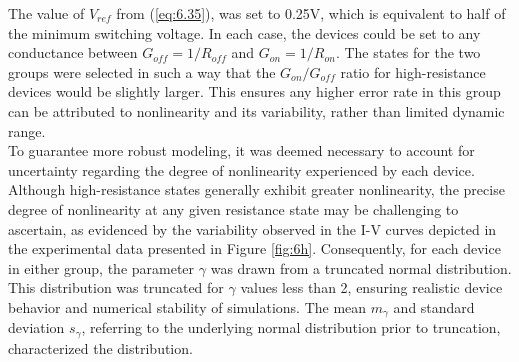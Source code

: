 \noindent The value of $V_{ref}$ from (\ref{eq:6.35}), was set to 0.25V, which is equivalent to half of the minimum switching voltage. In each case, the devices could be set to any conductance between $G_{off} = 1/R_{off}$ and $G_{on} = 1/R_{on}$. The states for the two groups were selected in such a way that the $G_{on}/G_{off}$ ratio for high-resistance devices would be slightly larger. This ensures any higher error rate in this group can be attributed to nonlinearity and its variability, rather than limited dynamic range.\\



\noindent To guarantee more robust modeling, it was deemed necessary to account for uncertainty regarding the degree of nonlinearity experienced by each device. Although high-resistance states generally exhibit greater nonlinearity, the precise degree of nonlinearity at any given resistance state may be challenging to ascertain, as evidenced by the variability observed in the I-V curves depicted in the experimental data presented in Figure \ref{fig:6h}. Consequently, for each device in either group, the parameter $\gamma$ was drawn from a truncated normal distribution. This distribution was truncated for $\gamma$ values less than 2, ensuring realistic device behavior and numerical stability of simulations. The mean $m_\gamma$ and standard deviation $s_\gamma$, referring to the underlying normal distribution prior to truncation, characterized the distribution. \\

